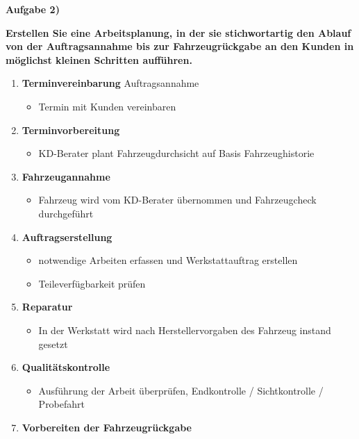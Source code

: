 \textbf{Aufgabe 2)}

\textbf{Erstellen Sie eine Arbeitsplanung, in der sie stichwortartig den
Ablauf von der Auftragsannahme bis zur Fahrzeugrückgabe an den Kunden in
möglichst kleinen Schritten aufführen.}

\begin{enumerate}
\item
  \textbf{Terminvereinbarung} Auftragsannahme

  \begin{itemize}
  \item
    Termin mit Kunden vereinbaren
  \end{itemize}
\item
  \textbf{Terminvorbereitung}

  \begin{itemize}
  \item
    KD-Berater plant Fahrzeugdurchsicht auf Basis Fahrzeughistorie
  \end{itemize}
\item
  \textbf{Fahrzeugannahme}

  \begin{itemize}
  \item
    Fahrzeug wird vom KD-Berater übernommen und Fahrzeugcheck
    durchgeführt
  \end{itemize}
\item
  \textbf{Auftragserstellung}

  \begin{itemize}
  \item
    notwendige Arbeiten erfassen und Werkstattauftrag erstellen
  \item
    Teileverfügbarkeit prüfen
  \end{itemize}
\item
  \textbf{Reparatur}

  \begin{itemize}
  \item
    In der Werkstatt wird nach Herstellervorgaben des Fahrzeug instand
    gesetzt
  \end{itemize}
\item
  \textbf{Qualitätskontrolle}

  \begin{itemize}
  \item
    Ausführung der Arbeit überprüfen, Endkontrolle / Sichtkontrolle /
    Probefahrt
  \end{itemize}
\item
  \textbf{Vorbereiten der Fahrzeugrückgabe}


\end{enumerate}
